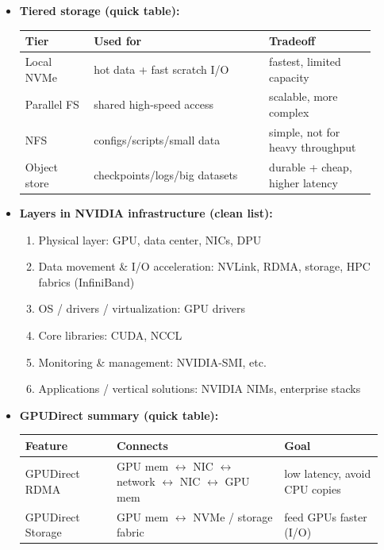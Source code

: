 \documentclass[11pt]{article}
\newcommand{\blue}[1]{\textcolor{myblue}{#1}}
\newcommand{\term}[1]{\textbf{\blue{#1}}}
\begin{document}
\begin{itemize}[leftmargin=1.2em]
    \item \term{Tiered storage (quick table):}
    \begin{center}
    \renewcommand{\arraystretch}{1.15}
    \begin{tabular}{|p{0.18\linewidth}|p{0.46\linewidth}|p{0.28\linewidth}|}
    \hline
    \textbf{Tier} & \textbf{Used for} & \textbf{Tradeoff} \\
    \hline
    Local NVMe & hot data + fast scratch I/O & fastest, limited capacity \\
    \hline
    Parallel FS & shared high-speed access & scalable, more complex \\
    \hline
    NFS & configs/scripts/small data & simple, not for heavy throughput \\
    \hline
    Object store & checkpoints/logs/big datasets & durable + cheap, higher latency \\
    \hline
    \end{tabular}
    \end{center}
    
    \item \term{Layers in NVIDIA infrastructure (clean list):}
    \begin{enumerate}[leftmargin=1.2em]
    \item Physical layer: GPU, data center, NICs, DPU
    \item Data movement \& I/O acceleration: NVLink, RDMA, storage, HPC fabrics (InfiniBand)
    \item OS / drivers / virtualization: GPU drivers
    \item Core libraries: CUDA, NCCL
    \item Monitoring \& management: NVIDIA-SMI, etc.
    \item Applications / vertical solutions: NVIDIA NIMs, enterprise stacks
    \end{enumerate}
    
    \item \term{GPUDirect summary (quick table):}
    \begin{center}
    \renewcommand{\arraystretch}{1.15}
    \begin{tabular}{|p{0.24\linewidth}|p{0.44\linewidth}|p{0.26\linewidth}|}
    \hline
    \textbf{Feature} & \textbf{Connects} & \textbf{Goal} \\
    \hline
    GPUDirect RDMA & GPU mem $\leftrightarrow$ NIC $\leftrightarrow$ network $\leftrightarrow$ NIC $\leftrightarrow$ GPU mem & low latency, avoid CPU copies \\
    \hline
    GPUDirect Storage & GPU mem $\leftrightarrow$ NVMe / storage fabric & feed GPUs faster (I/O) \\
    \hline
    \end{tabular}
    \end{center}
    

\end{itemize}
\end{document}
